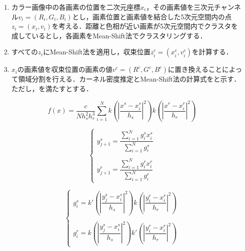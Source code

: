       \begin{enumerate}
        \setlength{\itemsep}{-5pt}
        \item カラー画像中の各画素の位置を二次元座標$x_i$，その画素値を三次元チャンネル$v_{i} =(R_{i},G_{i},B_{i})$とし，画素位置と画素値を結合した5次元空間内の点$z_{i} = (x_{i}, v_{i})$を考える．距離と色相が近い画素が5次元空間内でクラスタを成しているとし，各画素をMean-Shift法でクラスタリングする．
        \item すべての$z_{i}$にMean-Shift法を適用し，収束位置$z_{i}^c = (x_{i}^c, v_{i}^c)$を計算する．
        \item $x_{i}$の画素値を収束位置の画素の値$v^c = (R^c, G^c, B^c)$に置き換えることによって領域分割を行える．カーネル密度推定とMean-Shift法の計算式をと示す．ただし，を満たすとする．
      \end{enumerate}
    
      \begin{equation}
        \label{Mean-Shift法1}
        f(x) = \dfrac{c} {N h_{s}^2 h_{r}^3}
          \sum_{i=1}^{N}
          k (|\dfrac{x^s - x_{i}^s} {h_{s}}|^2) k (|\dfrac{x^r - x_{i}^r} {h_{r}}|^2)
      \end{equation}

      \begin{equation}
        \label{Mean-Shift法2}
        \left\{
          \begin{array}{l}
            y_{j+1}^s = 
              \dfrac{\sum_{i=1}^{N} g_{i}^s x_{i}^s} {\sum_{i=1}^{N} g_{i}^s} \\ \\
            y_{j+1}^r = 
              \dfrac{\sum_{i=1}^{N} g_{i}^r x_{i}^r} {\sum_{i=1}^{N} g_{i}^r}
          \end{array}
        \right.
      \end{equation}

      \begin{equation}
        \label{Mean-Shift法3}
        \left\{
          \begin{array}{l}
            g_{i}^s = k' (|\dfrac{y_{j}^s - x_{i}^s} {h_{s}}|^2)
              k  (|\dfrac{y_{i}^r - x_{i}^r} {h_{r}}|^2) \\ \\
            g_{i}^r = k  (|\dfrac{y_{j}^s - x_{i}^s} {h_{s}}|^2) 
              k' (|\dfrac{y_{i}^r - x_{i}^r} {h_{r}}|^2)
          \end{array}
        \right.
      \end{equation}

